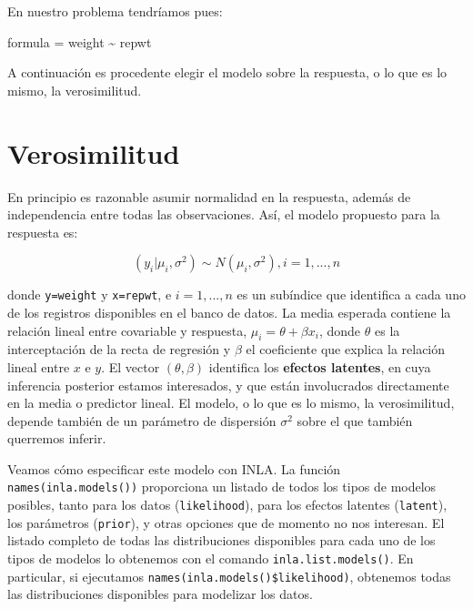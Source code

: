 \documentclass[
]{book}
\newenvironment{Shaded}{\begin{snugshade}}{\end{snugshade}}
\newcommand{\NormalTok}[1]{#1}
\newcommand{\OtherTok}[1]{\textcolor[rgb]{0.56,0.35,0.01}{#1}}
\newcommand{\SpecialCharTok}[1]{\textcolor[rgb]{0.00,0.00,0.00}{#1}}
\begin{document}
En nuestro problema tendríamos pues:

\begin{Shaded}
\begin{Highlighting}[]
\NormalTok{formula }\OtherTok{=}\NormalTok{ weight }\SpecialCharTok{\textasciitilde{}}\NormalTok{ repwt}
\end{Highlighting}
\end{Shaded}

A continuación es procedente elegir el modelo sobre la respuesta, o lo
que es lo mismo, la verosimilitud.

\hypertarget{verosimilitud}{%
\section{Verosimilitud}\label{verosimilitud}}

En principio es razonable asumir normalidad en la respuesta, además de independencia entre todas las observaciones. Así, el modelo propuesto para la respuesta es:

\[(y_i|\mu_i,\sigma^2) \sim N(\mu_i,\sigma^2), i=1,...,n\]

donde \texttt{y=weight} y \texttt{x=repwt}, e \(i=1,...,n\) es un subíndice que identifica a cada uno de los registros disponibles en el banco de datos. La media esperada contiene la relación lineal entre covariable y respuesta, \(\mu_i=\theta+\beta x_i\), donde \(\theta\) es la interceptación de la recta de regresión y \(\beta\) el coeficiente que explica la relación lineal entre \(x\) e \(y\). El vector \((\theta,\beta)\) identifica los \textbf{efectos latentes}, en cuya inferencia posterior estamos interesados, y que están involucrados directamente en la media o predictor lineal. El modelo, o lo que es lo mismo, la verosimilitud, depende también de un parámetro de dispersión \(\sigma^2\) sobre el que también querremos inferir.

Veamos cómo especificar este modelo con INLA. La función \texttt{names(inla.models())} proporciona un listado de todos los
tipos de modelos posibles, tanto para los datos (\texttt{likelihood}), para los efectos latentes (\texttt{latent}), los parámetros
(\texttt{prior}), y otras opciones que de momento no nos interesan. El listado completo de todas las distribuciones disponibles para cada uno de los tipos de modelos lo obtenemos con el comando \texttt{inla.list.models()}. En particular, si ejecutamos \texttt{names(inla.models()\$likelihood)}, obtenemos todas las distribuciones disponibles para modelizar los datos.
\end{document}
